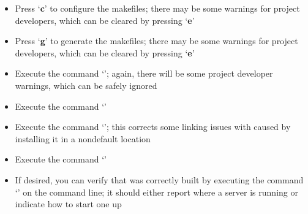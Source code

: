 \begin{itemize}
\item\exSp{}Press `\textbf{c}' to configure the makefiles; there may be some
 warnings for project developers, which can be cleared by pressing
`\textbf{e}'
\item\exSp{}Press `\textbf{g}' to generate the makefiles; there may be some 
warnings for project developers, which can be cleared by pressing `\textbf{e}'
\item\exSp{}Execute the command `'; again, there will be some project
developer warnings, which can be safely ignored
\item\exSp{}Execute the command `'
\item\exSp{}Execute the command
`';
this corrects some linking issues with \yarp{} caused by installing it in a
non\longDash{}default location
\item\exSp{}Execute the command `'
\item\exSp{}If desired, you can verify that \yarp{} was correctly built by executing the
command `' on the command line; it should either report where a \yarp{}
server is running or indicate how to start one up
\end{itemize}
\tertiaryEnd
{}
